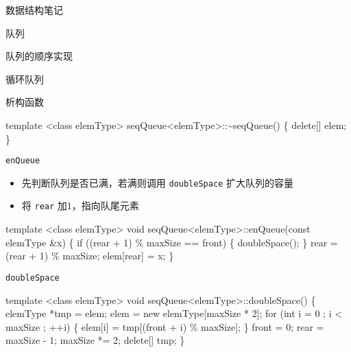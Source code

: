 \documentclass[
  ignorenonframetext,
]{beamer}
\newenvironment{Shaded}{}{}
\newcommand{\NormalTok}[1]{#1}
\providecommand{\tightlist}{%
  \setlength{\itemsep}{0pt}\setlength{\parskip}{0pt}}
\begin{document}
\begin{frame}[fragile]{数据结构笔记}
\begin{block}{队列}
\begin{block}{队列的顺序实现}
\begin{block}{循环队列}
\begin{block}{析构函数}
\protect{}\label{ux6790ux6784ux51fdux6570-3}
\begin{Shaded}
\begin{Highlighting}[]
\NormalTok{template \textless{}class elemType\textgreater{}}
\NormalTok{seqQueue\textless{}elemType\textgreater{}::\textasciitilde{}seqQueue()}
\NormalTok{\{}
\NormalTok{  delete[] elem;}
\NormalTok{\}}
\end{Highlighting}
\end{Shaded}
\end{block}

\begin{block}{\texttt{enQueue}}
\protect{}\label{enqueue}
\begin{itemize}
\tightlist
\item
  先判断队列是否已满，若满则调用 \texttt{doubleSpace} 扩大队列的容量
\item
  将 \texttt{rear} 加1，指向队尾元素
\end{itemize}

\begin{Shaded}
\begin{Highlighting}[]
\NormalTok{template \textless{}class elemType\textgreater{}}
\NormalTok{void seqQueue\textless{}elemType\textgreater{}::enQueue(const elemType \&x)}
\NormalTok{\{}
\NormalTok{  if ((rear + 1) \% maxSize == front)}
\NormalTok{  \{}
\NormalTok{    doubleSpace();}
\NormalTok{  \}}
\NormalTok{  rear = (rear + 1) \% maxSize;}
\NormalTok{  elem[rear] = x;}
\NormalTok{\}}
\end{Highlighting}
\end{Shaded}
\end{block}

\begin{block}{\texttt{doubleSpace}}
\protect{}\label{doublespace-1}
\begin{Shaded}
\begin{Highlighting}[]
\NormalTok{template \textless{}class elemType\textgreater{}}
\NormalTok{void seqQueue\textless{}elemType\textgreater{}::doubleSpace()}
\NormalTok{\{}
\NormalTok{  elemType *tmp = elem;}
\NormalTok{  elem = new elemType[maxSize * 2];}
\NormalTok{  for (int i = 0 ; i \textless{} maxSize ; ++i)}
\NormalTok{  \{}
\NormalTok{    elem[i] = tmp[(front + i) \% maxSize];}
\NormalTok{  \}}
\NormalTok{  front = 0;}
\NormalTok{  rear = maxSize {-} 1;}
\NormalTok{  maxSize *= 2;}
\NormalTok{  delete[] tmp;}
\NormalTok{\}}
\end{Highlighting}
\end{Shaded}
\end{block}


\end{block}
\end{block}
\end{block}
\end{frame}
\end{document}
